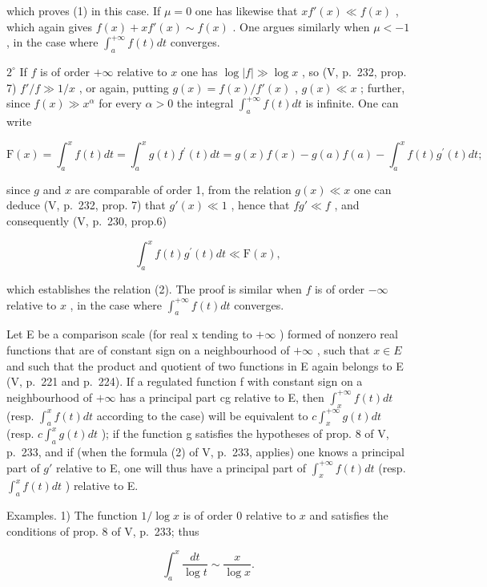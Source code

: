 which proves (1) in this case. If \(\mu = 0\) one has likewise that \(xf'(x) \ll f(x)\) , which again gives \(f(x) + xf'(x) \sim f(x)\) . One argues similarly when \(\mu < -1\) , in the case where \(\int_{a}^{+\infty} f(t) dt\) converges.

\(2^{\circ}\) If \(f\) is of order \(+\infty\) relative to \(x\) one has \(\log |f| \gg \log x\) , so (V, p.~232, prop. 7) \(f'/f \gg 1/x\) , or again, putting \(g(x) = f(x)/f'(x)\) , \(g(x) \ll x\) ; further, since \(f(x) \gg x^{\alpha}\) for every \(\alpha > 0\) the integral \(\int_{a}^{+\infty} f(t) dt\) is infinite. One can write

\[
\mathrm{F} (x) = \int_ {a} ^ {x} f (t) d t = \int_ {a} ^ {x} g (t) f ^ {\prime} (t) d t = g (x) f (x) - g (a) f (a) - \int_ {a} ^ {x} f (t) g ^ {\prime} (t) d t;
\]

since \(g\) and \(x\) are comparable of order 1, from the relation \(g(x) \ll x\) one can deduce (V, p.~232, prop. 7) that \(g'(x) \ll 1\) , hence that \(fg' \ll f\) , and consequently (V, p.~230, prop.6)

\[
\int_ {a} ^ {x} f (t) g ^ {\prime} (t) d t \ll \mathrm{F} (x),
\]

which establishes the relation (2). The proof is similar when \(f\) is of order \(-\infty\) relative to \(x\) , in the case where \(\int_{a}^{+\infty} f(t) dt\) converges.

Let E be a comparison scale (for real x tending to \(+\infty\) ) formed of nonzero real functions that are of constant sign on a neighbourhood of \(+\infty\) , such that \(x \in E\) and such that the product and quotient of two functions in E again belongs to E (V, p.~221 and p.~224). If a regulated function f with constant sign on a neighbourhood of \(+\infty\) has a principal part cg relative to E, then \(\int_{x}^{+\infty} f(t) dt\) (resp. \(\int_{a}^{x} f(t) dt\) according to the case) will be equivalent to \(c \int_{x}^{+\infty} g(t) dt\) (resp. \(c \int_{a}^{x} g(t) dt\) ); if the function g satisfies the hypotheses of prop. 8 of V, p.~233, and if (when the formula (2) of V, p.~233, applies) one knows a principal part of \(g'\) relative to E, one will thus have a principal part of \(\int_{x}^{+\infty} f(t) dt\) (resp. \(\int_{a}^{x} f(t) dt\) ) relative to E.

Examples. 1) The function \(1 / \log x\) is of order 0 relative to \(x\) and satisfies the conditions of prop. 8 of V, p.~233; thus

\[
\int_ {a} ^ {x} \frac {d t}{\log t} \sim \frac {x}{\log x}.
\]

